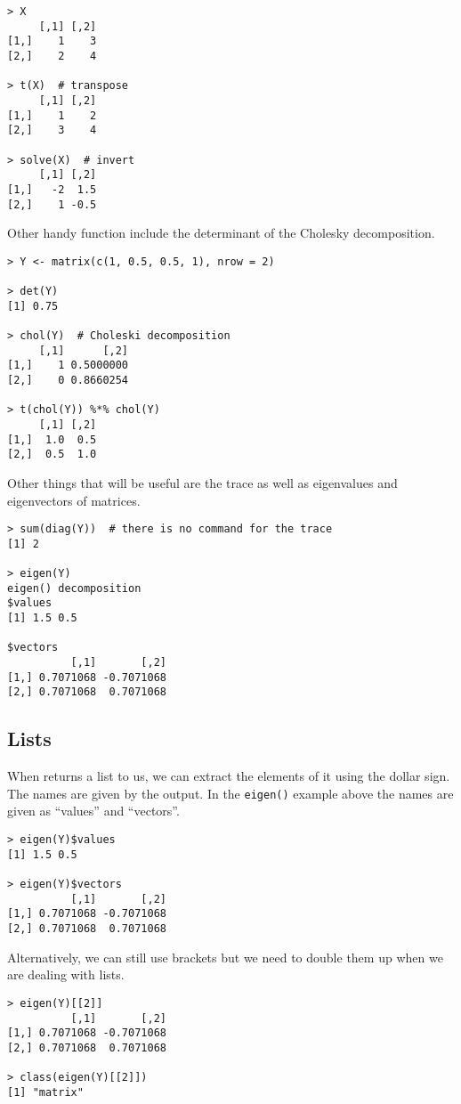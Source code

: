 \begin{lstlisting}
> X
     [,1] [,2]
[1,]    1    3
[2,]    2    4

> t(X)  # transpose
     [,1] [,2]
[1,]    1    2
[2,]    3    4

> solve(X)  # invert
     [,1] [,2]
[1,]   -2  1.5
[2,]    1 -0.5
\end{lstlisting}

Other handy function include the determinant of the Cholesky decomposition.

\begin{lstlisting}
> Y <- matrix(c(1, 0.5, 0.5, 1), nrow = 2)

> det(Y)
[1] 0.75

> chol(Y)  # Choleski decomposition
     [,1]      [,2]
[1,]    1 0.5000000
[2,]    0 0.8660254

> t(chol(Y)) %*% chol(Y) 
     [,1] [,2]
[1,]  1.0  0.5
[2,]  0.5  1.0
\end{lstlisting}

Other things that will be useful are the trace as well as eigenvalues and eigenvectors of matrices.

\begin{lstlisting}
> sum(diag(Y))  # there is no command for the trace
[1] 2

> eigen(Y)
eigen() decomposition
$values
[1] 1.5 0.5

$vectors
          [,1]       [,2]
[1,] 0.7071068 -0.7071068
[2,] 0.7071068  0.7071068
\end{lstlisting}

\subsection{Lists}

When \R returns a list to us, we can extract the elements of it using the dollar sign. The names are given by the output. In the \texttt{eigen()} example above the names are given as ``values'' and ``vectors''.

\begin{lstlisting}
> eigen(Y)$values
[1] 1.5 0.5

> eigen(Y)$vectors
          [,1]       [,2]
[1,] 0.7071068 -0.7071068
[2,] 0.7071068  0.7071068
\end{lstlisting}

Alternatively, we can still use brackets but we need to double them up when we are dealing with lists.

\begin{lstlisting}
> eigen(Y)[[2]]
          [,1]       [,2]
[1,] 0.7071068 -0.7071068
[2,] 0.7071068  0.7071068

> class(eigen(Y)[[2]])
[1] "matrix"
\end{lstlisting}

